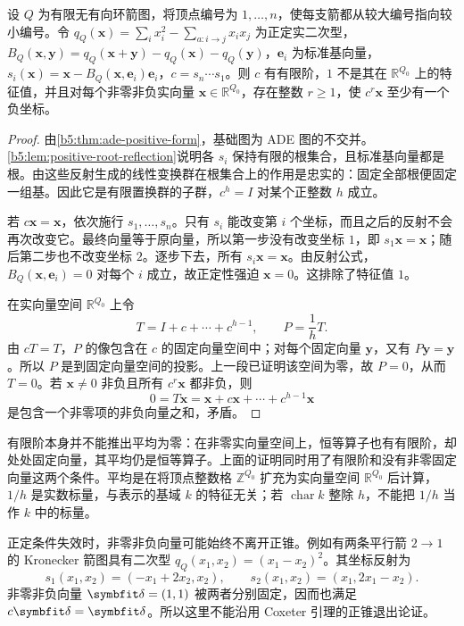 \begin{lemma}\label{b5:lem:coxeter-exits-positive-cone}
	设 \(Q\) 为有限无有向环箭图，将顶点编号为 \(1,\ldots,n\)，使每支箭都从较大编号指向较小编号。令 \(q_Q(\mathbf x)=\sum_i x_i^2-\sum_{a:i\to j}x_ix_j\) 为正定实二次型，\(B_Q(\mathbf x,\mathbf y)=q_Q(\mathbf x+\mathbf y)-q_Q(\mathbf x)-q_Q(\mathbf y)\)，\(\mathbf e_i\) 为标准基向量，\(s_i(\mathbf x)=\mathbf x-B_Q(\mathbf x,\mathbf e_i)\mathbf e_i\)，\(c=s_n\cdots s_1\)。则 \(c\) 有有限阶，\(1\) 不是其在 \(\mathbb R^{Q_0}\) 上的特征值，并且对每个非零非负实向量 \(\mathbf x\in\mathbb R^{Q_0}\)，存在整数 \(r\ge1\)，使 \(c^r\mathbf x\) 至少有一个负坐标。
\end{lemma}
\begin{proof}
	由\cref{b5:thm:ade-positive-form}，基础图为 ADE 图的不交并。\cref{b5:lem:positive-root-reflection}说明各 \(s_i\) 保持有限的根集合，且标准基向量都是根。由这些反射生成的线性变换群在根集合上的作用是忠实的：固定全部根便固定一组基。因此它是有限置换群的子群，\(c^h=I\) 对某个正整数 \(h\) 成立。

	若 \(c\mathbf x=\mathbf x\)，依次施行 \(s_1,\ldots,s_n\)。只有 \(s_i\) 能改变第 \(i\) 个坐标，而且之后的反射不会再次改变它。最终向量等于原向量，所以第一步没有改变坐标 \(1\)，即 \(s_1\mathbf x=\mathbf x\)；随后第二步也不改变坐标 \(2\)。逐步下去，所有 \(s_i\mathbf x=\mathbf x\)。由反射公式，\(B_Q(\mathbf x,\mathbf e_i)=0\) 对每个 \(i\) 成立，故正定性强迫 \(\mathbf x=0\)。这排除了特征值 \(1\)。

	在实向量空间 \(\mathbb R^{Q_0}\) 上令
	\[
		T=I+c+\cdots+c^{h-1},\qquad P=\frac1h T.
	\]
	由 \(cT=T\)，\(P\) 的像包含在 \(c\) 的固定向量空间中；对每个固定向量 \(\mathbf y\)，又有 \(P\mathbf y=\mathbf y\)。所以 \(P\) 是到固定向量空间的投影。上一段已证明该空间为零，故 \(P=0\)，从而 \(T=0\)。若 \(\mathbf x\neq0\) 非负且所有 \(c^r\mathbf x\) 都非负，则
	\[
		0=T\mathbf x=\mathbf x+c\mathbf x+\cdots+c^{h-1}\mathbf x
	\]
	是包含一个非零项的非负向量之和，矛盾。
\end{proof}

有限阶本身并不能推出平均为零：在非零实向量空间上，恒等算子也有有限阶，却处处固定向量，其平均仍是恒等算子。上面的证明同时用了有限阶和没有非零固定向量这两个条件。平均是在将顶点整数格 \(\mathbb Z^{Q_0}\) 扩充为实向量空间 \(\mathbb R^{Q_0}\) 后计算，\(1/h\) 是实数标量，与表示的基域 \(k\) 的特征无关；若 \(\operatorname{char}k\) 整除 \(h\)，不能把 \(1/h\) 当作 \(k\) 中的标量。

\ProseParagraphBreak

正定条件失效时，非零非负向量可能始终不离开正锥。例如有两条平行箭 \(2\to1\) 的 Kronecker 箭图具有二次型 \(q_Q(x_1,x_2)=(x_1-x_2)^2\)。其坐标反射为
\[
	s_1(x_1,x_2)=(-x_1+2x_2,x_2),\qquad s_2(x_1,x_2)=(x_1,2x_1-x_2).
\]
非零非负向量 \(\symbfit\delta=(1,1)\) 被两者分别固定，因而也满足 \(c\symbfit\delta=\symbfit\delta\)。所以这里不能沿用 Coxeter 引理的正锥退出论证。

